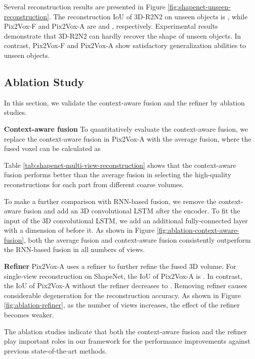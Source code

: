 \documentclass[10pt,twocolumn,letterpaper]{article}
\begin{document}
Several reconstruction results are presented in Figure \ref{fig:shapenet-unseen-reconstruction}.
The reconstruction IoU of 3D-R2N2 on unseen objects is , while Pix2Vox-F and Pix2Vox-A are  and , respectively.
Experimental results demonstrate that 3D-R2N2 can hardly recover the shape of unseen objects.
In contrast, Pix2Vox-F and Pix2Vox-A show satisfactory generalization abilities to unseen objects.

\subsection{Ablation Study}

In this section, we validate the context-aware fusion and the refiner by ablation studies.

\noindent \textbf{Context-aware fusion}
To quantitatively evaluate the context-aware fusion, we replace the context-aware fusion in Pix2Vox-A with the average fusion, where the fused voxel  can be calculated as


Table \ref{tab:shapenet-multi-view-reconstruction} shows that the context-aware fusion performs better than the average fusion in selecting the high-quality reconstructions for each part from different coarse volumes.

To make a further comparison with RNN-based fusion, we remove the context-aware fusion and add an 3D convolutional LSTM \cite{DBLP:conf/eccv/ChoyXGCS16} after the encoder.
To fit the input of the 3D convolutional LSTM, we add an additional fully-connected layer with a dimension of  before it.
As shown in Figure \ref{fig:ablation-context-aware-fusion}, both the average fusion and context-aware fusion consistently outperform the RNN-based fusion in all numbers of views. 

\noindent \textbf{Refiner}
Pix2Vox-A uses a refiner to further refine the fused 3D volume.
For single-view reconstruction on ShapeNet, the IoU of Pix2Vox-A is . 
In contrast, the IoU of Pix2Vox-A without the refiner decreases to .
Removing refiner causes considerable degeneration for the reconstruction accuracy.
As shown in Figure \ref{fig:ablation-refiner}, as the number of views increases, the effect of the refiner becomes weaker.

The ablation studies indicate that both the context-aware fusion and the refiner play important roles in our framework for the performance improvements against previous state-of-the-art methods.
\end{document}
